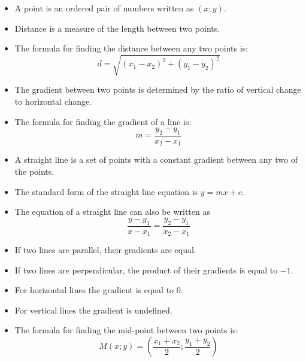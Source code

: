 \summary{}
\begin{itemize}[noitemsep]
\item A point is an ordered pair of numbers written as $(x;y)$.
\item Distance is a measure of the length between two points.
\item The formula for finding the distance between  any two points is: 
\begin{equation*}
d=\sqrt{{({x}_{1}-{x}_{2})}^{2}+{({y}_{1}-{y}_{2})}^{2}}
\end{equation*}
\item The gradient between two points is determined by the ratio of vertical change to horizontal change.

\item The formula for finding the gradient of a line is: 
\begin{equation*}
m=\frac{{y}_{2}-{y}_{1}}{{x}_{2}-{x}_{1}}
\end{equation*}
\item A straight line is a set of points with a constant gradient between any two of the
points.
\item The standard form of the straight line equation is $y=mx+c$.
\item The equation of a straight line can also be written as  
\begin{equation*}
\dfrac{y-y_1}{x-x_1}=\dfrac{y_2-y_1}{x_2-x_1}
\end{equation*}
\item If two lines are parallel, their gradients are equal.
\item If two lines are perpendicular, the product of their gradients is equal to $-1$.
\item For horizontal lines the gradient is equal to $0$.
\item For vertical lines the gradient is undefined.

\item The formula for finding the mid-point between two points is: 
\begin{equation*}
M(x;y) = \left(\frac{{x}_{1}+{x}_{2}}{2};\frac{{y}_{1}+{y}_{2}}{2}\right)
\end{equation*}
\end{itemize}


